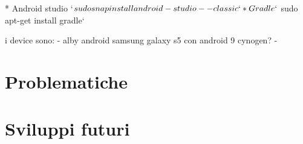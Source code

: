 \documentclass[target=bach]{thud}
\begin{document}
 * Android studio `$ sudo snap install android-studio --classic`
 * Gradle `$ sudo apt-get install gradle`

i device sono:
- alby android samsung galaxy s5 con android 9 cynogen?
-

\section{Problematiche}
\section{Sviluppi futuri}


\appendix




\backmatter





\end{document}
